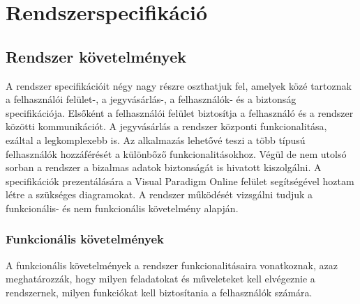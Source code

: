 \chapter{Rendszerspecifikáció} \label{fejezet3}

\section {Rendszer követelmények}

A rendszer specifikációit négy nagy részre oszthatjuk fel, amelyek közé tartoznak a felhasználói felület-, a jegyvásárlás-, a felhasználók- és a biztonság specifikációja. Elsőként a felhasználói felület biztosítja a felhasználó és a rendszer közötti kommunikációt. A jegyvásárlás a rendszer központi funkcionalitása, ezáltal a legkomplexebb is. Az alkalmazás lehetővé teszi a több típusú felhasználók hozzáférését a különbőző funkcionalitásokhoz. Végül de nem utolsó sorban a rendszer a bizalmas adatok biztonságát is hivatott kiszolgálni. A specifikációk prezentálására a Visual Paradigm Online felület segítségével hoztam létre a szükséges diagramokat. A rendszer működését vizsgálni tudjuk a funkcionális- és nem funkcionális követelmény alapján.
\subsection {Funkcionális követelmények} \label{rendszerFunkcionális}

A funkcionális követelmények a rendszer funkcionalitásaira vonatkoznak, azaz meghatározzák, hogy milyen feladatokat és műveleteket kell elvégeznie a rendszernek, milyen funkciókat kell biztosítania a felhasználók számára.

